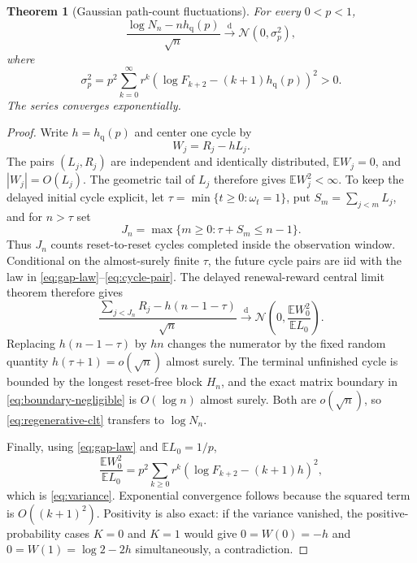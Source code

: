 \documentclass[11pt,a4paper]{amsart}
\newtheorem{theorem}{Theorem}[section]
\theoremstyle{definition}
\theoremstyle{remark}
\newcommand{\Exp}{\mathbb E}
\newcommand{\hq}{h_{\mathrm q}}
\begin{document}
\begin{theorem}[Gaussian path-count fluctuations]\label{thm:clt}
For every $0<p<1$,
\begin{equation}\label{eq:clt}
 \frac{\log N_n-n\hq(p)}{\sqrt n}
 \xrightarrow{\mathrm d}\mathcal N(0,\sigma_p^2),
\end{equation}
where
\begin{equation}\label{eq:variance}
 \boxed{\displaystyle
 \sigma_p^2=p^2\sum_{k=0}^{\infty}r^k
 \left(\log F_{k+2}-(k+1)\hq(p)\right)^2>0.}
\end{equation}
The series converges exponentially.
\end{theorem}

\begin{proof}
Write $h=\hq(p)$ and center one cycle by
\[
 W_j=R_j-hL_j.
\]
The pairs $(L_j,R_j)$ are independent and identically distributed,
$\Exp W_j=0$, and $|W_j|=O(L_j)$.  The geometric tail of $L_j$ therefore
gives $\Exp W_j^2<\infty$.  To keep the delayed initial cycle explicit, let
$\tau=\min\{t\geq0:\omega_t=1\}$, put
$S_m=\sum_{j<m}L_j$, and for $n>\tau$ set
\[
 J_n=\max\{m\geq0:\tau+S_m\leq n-1\}.
\]
Thus $J_n$ counts reset-to-reset cycles completed inside the observation
window.  Conditional on the almost-surely finite $\tau$, the future cycle
pairs are iid with the law in \eqref{eq:gap-law}--\eqref{eq:cycle-pair}.
The delayed renewal-reward central limit theorem therefore gives
\begin{equation}\label{eq:regenerative-clt}
 \frac{\sum_{j<J_n}R_j-h(n-1-\tau)}{\sqrt n}
 \xrightarrow{\mathrm d}
 \mathcal N\left(0,\frac{\Exp W_0^2}{\Exp L_0}\right).
\end{equation}
Replacing $h(n-1-\tau)$ by $hn$ changes the numerator by the fixed random
quantity $h(\tau+1)=o(\sqrt n)$ almost surely.  The terminal unfinished cycle is
bounded by the longest reset-free block $H_n$, and the exact matrix boundary
in \eqref{eq:boundary-negligible} is $O(\log n)$ almost surely.  Both are
$o(\sqrt n)$, so \eqref{eq:regenerative-clt} transfers to $\log N_n$.

Finally, using \eqref{eq:gap-law} and $\Exp L_0=1/p$,
\[
 \frac{\Exp W_0^2}{\Exp L_0}
 =p^2\sum_{k\geq0}r^k
  \left(\log F_{k+2}-(k+1)h\right)^2,
\]
which is \eqref{eq:variance}.  Exponential convergence follows because the
squared term is $O((k+1)^2)$.  Positivity is also exact: if the variance
vanished, the positive-probability cases $K=0$ and $K=1$ would give
$0=W(0)=-h$ and $0=W(1)=\log2-2h$ simultaneously, a contradiction.
\end{proof}
\end{document}
